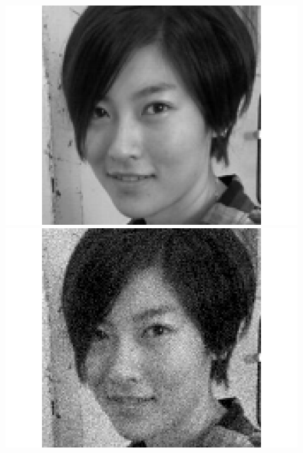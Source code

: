 \documentclass[runningheads]{llncs}
\begin{document}
  \begin{figure}[!h]
    \centering
    \begin{minipage}{0.45\linewidth}
    \includegraphics[width=\linewidth]{byzh_origine}
    \end{minipage}
    \begin{minipage}{0.45\linewidth}
    \includegraphics[width=\linewidth]{byzh_noisy}
    \end{minipage}
    \begin{minipage}{0.45\linewidth}

\end{minipage}
\end{figure}
\end{document}
